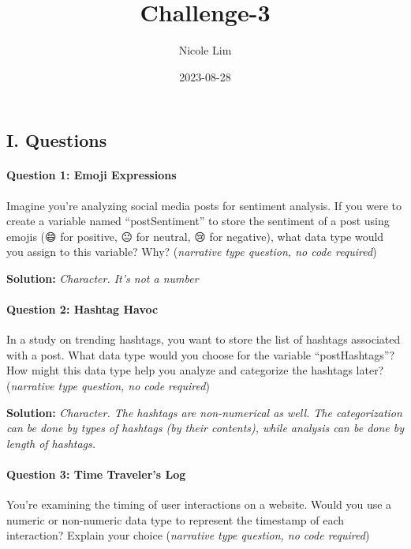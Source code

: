 \documentclass[
]{article}
\title{Challenge-3}
\author{Nicole Lim}
\date{2023-08-28}
\begin{document}
\maketitle

\hypertarget{i.-questions}{%
\subsection{I. Questions}\label{i.-questions}}

\hypertarget{question-1-emoji-expressions}{%
\paragraph{Question 1: Emoji
Expressions}\label{question-1-emoji-expressions}}

Imagine you're analyzing social media posts for sentiment analysis. If
you were to create a variable named ``postSentiment'' to store the
sentiment of a post using emojis (😄 for positive, 😐 for neutral, 😢
for negative), what data type would you assign to this variable? Why?
(\emph{narrative type question, no code required})

\textbf{Solution:} \emph{Character. It's not a number}

\hypertarget{question-2-hashtag-havoc}{%
\paragraph{Question 2: Hashtag Havoc}\label{question-2-hashtag-havoc}}

In a study on trending hashtags, you want to store the list of hashtags
associated with a post. What data type would you choose for the variable
``postHashtags''? How might this data type help you analyze and
categorize the hashtags later? (\emph{narrative type question, no code
required})

\textbf{Solution:} \emph{Character. The hashtags are non-numerical as
well. The categorization can be done by types of hashtags (by their
contents), while analysis can be done by length of hashtags.}

\hypertarget{question-3-time-travelers-log}{%
\paragraph{Question 3: Time Traveler's
Log}\label{question-3-time-travelers-log}}

You're examining the timing of user interactions on a website. Would you
use a numeric or non-numeric data type to represent the timestamp of
each interaction? Explain your choice (\emph{narrative type question, no
code required})
\end{document}
